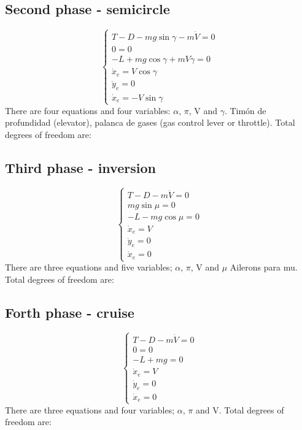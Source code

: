 \subsection*{Second phase - semicircle}
\begin{equation}
	\begin{cases}
		T - D -mg\sin\gamma-m\dot{V}=0\\
		0=0\\
		-L+mg\cos\gamma+mV\dot{\gamma}=0\\
		\dot{x}_e=V\cos\gamma\\
		\dot{y}_e=0\\
		\dot{x}_e=-V\sin\gamma
	\end{cases}
\label{eq:semicircle}
\end{equation}
There are four equations and four variables: $\alpha$, $\pi$, V and $\gamma$. Timón de profundidad (elevator), palanca de gases (gas control lever or throttle).
Total degrees of freedom are:


\subsection*{Third phase - inversion}
\begin{equation}
	\begin{cases}
		T - D -m\dot{V}=0\\
		mg\sin\mu=0\\
		-L-mg\cos\mu=0\\
		\dot{x}_e=V\\
		\dot{y}_e=0\\
		\dot{x}_e=0
	\end{cases}
\end{equation}
There are three equations and five variables; $\alpha$, $\pi$, V and $\mu$ Ailerons para mu.
Total degrees of freedom are:

\subsection*{Forth phase - cruise}
\begin{equation}
	\begin{cases}
		T - D -m\dot{V}=0\\
		0=0\\
		-L+mg=0\\
		\dot{x}_e=V\\
		\dot{y}_e=0\\
		\dot{x}_e=0
	\end{cases}
\end{equation}
There are three equations and four variables; $\alpha$, $\pi$ and V.
Total degrees of freedom are:
